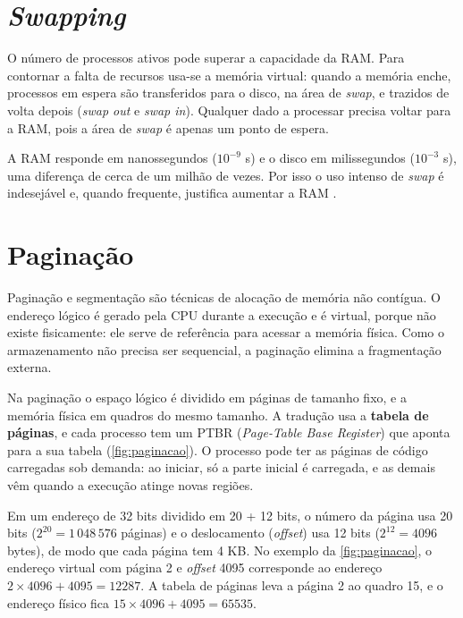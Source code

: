 \section{\textit{Swapping}}

O número de processos ativos pode superar a capacidade da RAM. Para contornar a falta de recursos usa-se a memória virtual: quando a memória enche, processos em espera são transferidos para o disco, na área de \textit{swap}, e trazidos de volta depois (\textit{swap out} e \textit{swap in}). Qualquer dado a processar precisa voltar para a RAM, pois a área de \textit{swap} é apenas um ponto de espera.

A RAM responde em nanossegundos ($10^{-9}$ s) e o disco em milissegundos ($10^{-3}$ s), uma diferença de cerca de um milhão de vezes. Por isso o uso intenso de \textit{swap} é indesejável e, quando frequente, justifica aumentar a RAM \cite{silberschatz2015}.

\section{Paginação}

Paginação e segmentação são técnicas de alocação de memória não contígua. O endereço lógico é gerado pela CPU durante a execução e é virtual, porque não existe fisicamente: ele serve de referência para acessar a memória física. Como o armazenamento não precisa ser sequencial, a paginação elimina a fragmentação externa.

Na paginação o espaço lógico é dividido em páginas de tamanho fixo, e a memória física em quadros do mesmo tamanho. A tradução usa a \textbf{tabela de páginas}, e cada processo tem um PTBR (\textit{Page-Table Base Register}) que aponta para a sua tabela (\autoref{fig:paginacao}). O processo pode ter as páginas de código carregadas sob demanda: ao iniciar, só a parte inicial é carregada, e as demais vêm quando a execução atinge novas regiões.

Em um endereço de 32 bits dividido em 20 + 12 bits, o número da página usa 20 bits ($2^{20} = 1\,048\,576$ páginas) e o deslocamento (\textit{offset}) usa 12 bits ($2^{12} = 4096$ bytes), de modo que cada página tem 4 KB. No exemplo da \autoref{fig:paginacao}, o endereço virtual com página 2 e \textit{offset} 4095 corresponde ao endereço $2 \times 4096 + 4095 = 12287$. A tabela de páginas leva a página 2 ao quadro 15, e o endereço físico fica $15 \times 4096 + 4095 = 65535$.

